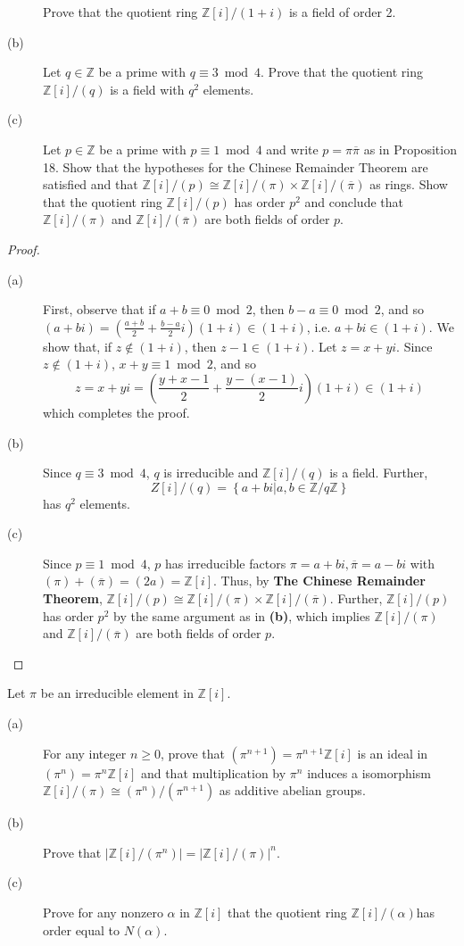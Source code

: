 \documentclass[12pt,leqno]{book}
\numberwithin{equation}{section}
\newcommand{\question}[2] {\vspace{.25in}\noindent\fbox{#1} #2 \vspace{.10in}}
\theoremstyle{definition}
\begin{document}
\question{6}{}\vspace{-.43in}\begin{description}
 \item [\hskip.3in(a)] Prove that the quotient ring $\mathbb{Z}[i]/(1+i)$ is a field of order 2.
 \item [(b)] Let $q\in\mathbb{Z}$ be a prime with $q\equiv3\bmod{4}$. Prove that the quotient ring $\mathbb{Z}[i]/(q)$ is a field with $q^2$ elements. 
 \item [(c)] Let $p\in\mathbb{Z}$ be a prime with $p\equiv1\bmod{4}$ and write $p=\pi\overline{\pi}$ as in Proposition 18. Show that the hypotheses for the Chinese Remainder Theorem are satisfied and that $\mathbb{Z}[i]/(p)\cong\mathbb{Z}[i]/(\pi)\times\mathbb{Z}[i]/(\overline{\pi})$ as rings. Show that the quotient ring $\mathbb{Z}[i]/(p)$ has order $p^2$ and conclude that $\mathbb{Z}[i]/(\pi)$ and $\mathbb{Z}[i]/(\overline{\pi})$ are both fields of order $p$.
\end{description}

\begin{proof}\indent
 \begin{description}
  \item [(a)] First, observe that if $a+b\equiv0\bmod{2}$, then $b-a\equiv0\bmod{2}$, and so $(a+bi)=\left(\frac{a+b}{2}+\frac{b-a}{2}i\right)(1+i)\in(1+i)$, i.e. $a+bi\in(1+i)$. We show that, if $z\notin(1+i)$, then $z-1\in(1+i)$. Let $z=x+yi$. Since $z\notin(1+i)$, $x+y\equiv1\bmod{2}$, and so \[z=x+yi=\left(\frac{y+x-1}{2}+\frac{y-(x-1)}{2}i\right)(1+i)\in(1+i)\] which completes the proof.
  \item [(b)] Since $q\equiv3\bmod{4}$, $q$ is irreducible and $\mathbb{Z}[i]/(q)$ is a field. Further, \[Z[i]/(q)=\left\{a+bi|a,b\in\mathbb{Z}/q\mathbb{Z}\right\}\] has $q^2$ elements.
  \item [(c)] Since $p\equiv1\bmod{4}$, $p$ has irreducible factors $\pi=a+bi,\overline{\pi}=a-bi$ with $(\pi)+(\overline{\pi})=(2a)=\mathbb{Z}[i]$. Thus, by \textbf{The Chinese Remainder Theorem}, $\mathbb{Z}[i]/(p)\cong\mathbb{Z}[i]/(\pi)\times\mathbb{Z}[i]/(\overline{\pi})$. Further, $\mathbb{Z}[i]/(p)$ has order $p^2$ by the same argument as in \textbf{(b)}, which implies $\mathbb{Z}[i]/(\pi)$ and $\mathbb{Z}[i]/(\overline{\pi})$ are both fields of order $p$.
 \end{description}

\end{proof}


\question{7}{Let $\pi$ be an irreducible element in $\mathbb{Z}[i]$.}
\begin{description}
 \item [(a)] For any integer $n\geq0$, prove that $(\pi^{n+1})=\pi^{n+1}\mathbb{Z}[i]$ is an ideal in $(\pi^n)=\pi^n\mathbb{Z}[i]$ and that multiplication by $\pi^n$ induces a isomorphism $\mathbb{Z}[i]/(\pi)\cong(\pi^n)/(\pi^{n+1})$ as additive abelian groups.
 \item [(b)] Prove that $|\mathbb{Z}[i]/(\pi^n)|=|\mathbb{Z}[i]/(\pi)|^n$.
 \item [(c)] Prove for any nonzero $\alpha$ in $\mathbb{Z}[i]$ that the quotient ring $\mathbb{Z}[i]/(\alpha)$has order equal to $N(\alpha)$.
\end{description}
\end{document}
